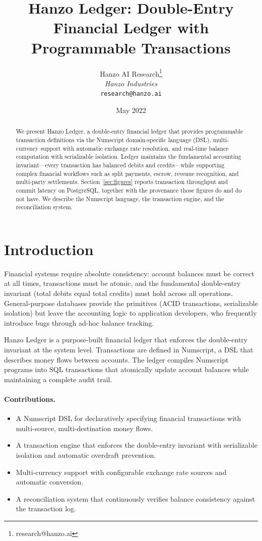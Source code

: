 \documentclass[11pt,twocolumn]{article}
\title{Hanzo Ledger: Double-Entry Financial Ledger with Programmable Transactions}
\author{Hanzo AI Research\thanks{research@hanzo.ai} \\ \textit{Hanzo Industries} \\ \texttt{research@hanzo.ai}}
\date{May 2022}
\begin{document}
\hanzocoverpage

\begin{abstract}
We present Hanzo Ledger, a double-entry financial ledger that provides programmable transaction definitions via the Numscript domain-specific language (DSL), multi-currency support with automatic exchange rate resolution, and real-time balance computation with serializable isolation. Ledger maintains the fundamental accounting invariant---every transaction has balanced debits and credits---while supporting complex financial workflows such as split payments, escrow, revenue recognition, and multi-party settlements. Section~\ref{sec:figures} reports transaction throughput and commit latency on PostgreSQL, together with the provenance those figures do and do not have. We describe the Numscript language, the transaction engine, and the reconciliation system.
\end{abstract}

\section{Introduction}

Financial systems require absolute consistency: account balances must be correct at all times, transactions must be atomic, and the fundamental double-entry invariant (total debits equal total credits) must hold across all operations. General-purpose databases provide the primitives (ACID transactions, serializable isolation) but leave the accounting logic to application developers, who frequently introduce bugs through ad-hoc balance tracking.

Hanzo Ledger is a purpose-built financial ledger that enforces the double-entry invariant at the system level. Transactions are defined in Numscript, a DSL that describes money flows between accounts. The ledger compiles Numscript programs into SQL transactions that atomically update account balances while maintaining a complete audit trail.

\paragraph{Contributions.}
\begin{itemize}
    \item A Numscript DSL for declaratively specifying financial transactions with multi-source, multi-destination money flows.
    \item A transaction engine that enforces the double-entry invariant with serializable isolation and automatic overdraft prevention.
    \item Multi-currency support with configurable exchange rate sources and automatic conversion.
    \item A reconciliation system that continuously verifies balance consistency against the transaction log.
\end{itemize}
\end{document}
